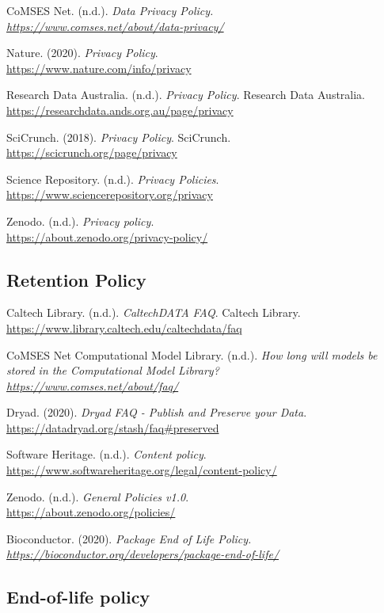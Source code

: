 \documentclass[11pt]{article}
\begin{document}
CoMSES Net. (n.d.). \emph{Data Privacy Policy.\\
\url{https://www.comses.net/about/data-privacy/}}

Nature. (2020). \emph{Privacy Policy}.\\
\url{https://www.nature.com/info/privacy}

Research Data Australia. (n.d.). \emph{Privacy Policy}. Research Data
Australia.\\
\url{https://researchdata.ands.org.au/page/privacy}

SciCrunch. (2018). \emph{Privacy Policy}. SciCrunch.\\
\url{https://scicrunch.org/page/privacy}

Science Repository. (n.d.). \emph{Privacy Policies}.\\
\url{https://www.sciencerepository.org/privacy}

Zenodo. (n.d.). \emph{Privacy policy}.\\
\url{https://about.zenodo.org/privacy-policy/}


\subsection{Retention Policy}
\label{retention-policy}

Caltech Library. (n.d.). \emph{CaltechDATA FAQ}. Caltech Library.\\
\url{https://www.library.caltech.edu/caltechdata/faq}

CoMSES Net Computational Model Library. (n.d.). \emph{How long will
models be stored in the Computational Model Library?\\
\url{https://www.comses.net/about/faq/}}

Dryad. (2020). \emph{Dryad FAQ - Publish and Preserve your Data}.\\
\url{https://datadryad.org/stash/faq\#preserved}

Software Heritage. (n.d.). \emph{Content policy}.\\
\url{https://www.softwareheritage.org/legal/content-policy/}

Zenodo. (n.d.). \emph{General Policies v1.0}.\\
\url{https://about.zenodo.org/policies/}

Bioconductor. (2020). \emph{Package End of Life Policy.\\
\url{https://bioconductor.org/developers/package-end-of-life/} }


\subsection{End-of-life policy}
\label{end-of-life-policy}
\end{document}
